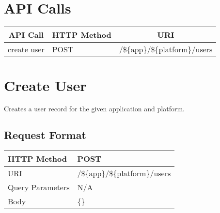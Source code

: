 
\section{API Calls}
\begin{center}
\begin{tabular}{|l||l||l|}
\hline

\multicolumn{1}{|c||}{\textbf{API Call}} &
\multicolumn{1}{c||}{\textbf{HTTP Method}} &
\multicolumn{1}{c|}{\textbf{URI}} \\

\hline
\hline
create user   & POST & /\$\{app\}/\$\{platform\}/users                \\
\hline
\end{tabular}
\end{center}


\section{Create User}

Creates a user record for the given application and platform.


\subsection{Request Format}

\begin{center}
\begin{tabular}{|l||l|}
\hline
HTTP Method & POST           \\
\hline
URI         & /\$\{app\}/\$\{platform\}/users \\
\hline
Query Parameters & N/A           \\
\hline
Body        & \{\}           \\
\hline
\end{tabular}
\end{center}


